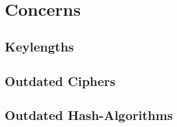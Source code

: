 \chapter{Concerns}

\section{Keylengths}

\section{Outdated Ciphers}

\section{Outdated Hash-Algorithms}

